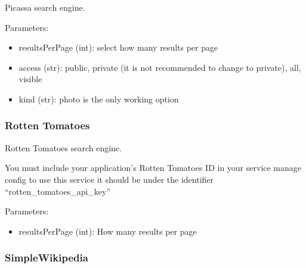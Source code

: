 \documentclass[letterpaper,10pt,english]{sphinxmanual}
\begin{document}
\begin{fulllineitems}
\label{api3.0:puppy.search.engine.Picassa}
Picassa search engine.

Parameters:
\begin{itemize}
\item {} 
resultsPerPage (int): select how many results per page

\item {} 
access (str): public, private (it is not recommended to change to private), all, visible

\item {} 
kind (str): photo is the only working option

\end{itemize}

\end{fulllineitems}



\subsubsection{Rotten Tomatoes}
\label{api3.0:rotten-tomatoes}

\begin{fulllineitems}
\label{api3.0:puppy.search.engine.RottenTomatoes}
Rotten Tomatoes search engine.

You must include your application's Rotten Tomatoes ID in your service manage config to use this service
it should be under the identifier ``rotten\_tomatoes\_api\_key''

Parameters:
\begin{itemize}
\item {} 
resultsPerPage (int): How many results per page

\end{itemize}

\end{fulllineitems}



\subsubsection{SimpleWikipedia}
\label{api3.0:simplewikipedia}
\end{document}
